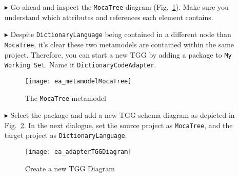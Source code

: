 \begin{itemize}

\item[$\blacktriangleright$] Go ahead and inspect the \texttt{MocaTree} diagram (Fig.~\ref{ea:mocaTree}). Make sure you understand which attributes and
references each element contains.

\item[$\blacktriangleright$] Despite \texttt{DictionaryLanguage} being contained in a different node than \texttt{MocaTree}, it's clear these two metamodels are
contained within the same project. Therefore, you can start a new TGG by adding a package to \texttt{My Working Set}. Name it
\texttt{Dict\-ion\-ary\-Code\-Adap\-ter}.

\newpage

\begin{figure}[htpb]
  \hspace{-3cm}
  \texttt{[image: ea\_metamodelMocaTree]}
  \caption{The \texttt{MocaTree} metamodel}
  \label{ea:mocaTree}
\end{figure}

\item[$\blacktriangleright$] Select the package and add a new TGG schema diagram as depicted in Fig.~\ref{ea:newTGGDiagram}. In the next dialogue,
set the source project as \texttt{MocaTree}, and the target project as \texttt{Dict\-ion\-ary\-Lang\-uage}.

\begin{figure}[h!]
\begin{center}
  \texttt{[image: ea\_adapterTGGDiagram]}
  \caption{Create a new TGG Diagram}
  \label{ea:newTGGDiagram}
\end{center}
\end{figure}

\end{itemize}

\clearpage

